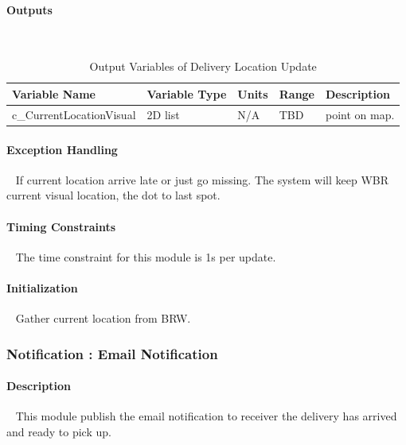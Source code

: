 \documentclass[12pt]{article}
\begin{document}
            \paragraph{Outputs}
            ~\newline
                \begin{table}[H]
                  \centering
                    \caption{Output Variables of Delivery Location Update} \label{tbl:Output Variables of Delivery Location Update}
                  \begin{tabularx}{\textwidth}{|p{5cm}|p{1.2cm}|p{1.2cm}|p{1cm}|X|}
                    \hline Variable Name & Variable Type & Units & Range & Description \\
                    \hline c\_CurrentLocationVisual & 2D list &  N/A & TBD & point on map.\\
                    \hline
                  \end{tabularx}
                \end{table} 
            \paragraph{Exception Handling}
            ~\newline
            If current location arrive late or just go missing. The system will keep WBR current visual location, the dot to last spot. \\
            
            \paragraph{Timing Constraints}
            ~\newline
            The time constraint for this module is 1s per update. \\
            
            \paragraph{Initialization}
            ~\newline
            Gather current location from BRW. \\

            
        \subsubsection{Notification : Email Notification}
            \paragraph{Description}
            ~\newline
            This module publish the email notification to receiver the delivery has arrived and ready to pick up.  
\end{document}

